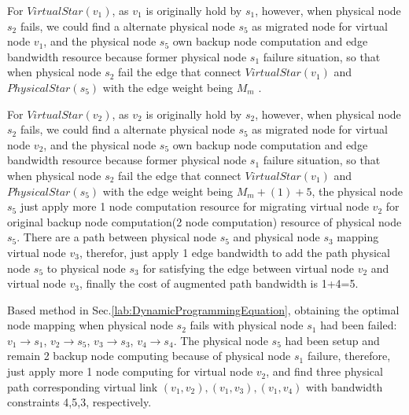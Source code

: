 For $VirtualStar(v_1)$, as $v_1$ is originally hold by $s_1$, however, when physical node $s_2$ fails, we could find a alternate physical node $s_5$ as migrated node for virtual node $v_1$, and the physical node $s_5$ own backup node computation and edge bandwidth resource because former physical node $s_1$ failure situation, so that when physical node $s_2$ fail the edge that connect $VirtualStar(v_1)$ and $PhysicalStar(s_5)$ with the edge weight being $M_m$ .


For $VirtualStar(v_2)$, as $v_2$ is originally hold by $s_2$, however, when physical node $s_2$ fails, we could find a alternate physical node $s_5$ as migrated node for virtual node $v_2$, and the physical node $s_5$ own backup node computation and edge bandwidth resource because former physical node $s_1$ failure situation, so that when physical node $s_2$ fail the edge that connect $VirtualStar(v_1)$ and $PhysicalStar(s_5)$ with the edge weight being $M_m+(1)+5$, the physical node $s_5$ just apply more 1 node computation resource for migrating virtual node $v_2$ for original backup node computation(2 node computation) resource of physical node $s_5$. There are a path between physical node $s_5$ and physical node $s_3$ mapping virtual node $v_3$, therefor, just apply 1 edge bandwidth to add the path physical node $s_5$ to physical node $s_3$ for satisfying the edge between virtual node $v_2$ and virtual node $v_3$, finally the cost of augmented path bandwidth is 1+4=5.

Based method in Sec.\ref{lab:DynamicProgrammingEquation}, obtaining the optimal node mapping when physical node $s_2$ fails with physical node $s_1$ had been failed: $v_1 \rightarrow s_1$, $v_2 \rightarrow s_5$, $v_3 \rightarrow s_3$, $v_4 \rightarrow s_4$. The physical node $s_5$ had been setup and remain 2 backup node computing because of physical node $s_1$ failure, therefore, just apply more 1 node computing for virtual node $v_2$, and find three physical path corresponding virtual link $(v_1,v_2),(v_1,v_3),(v_1,v_4)$ with bandwidth constraints 4,5,3, respectively.



